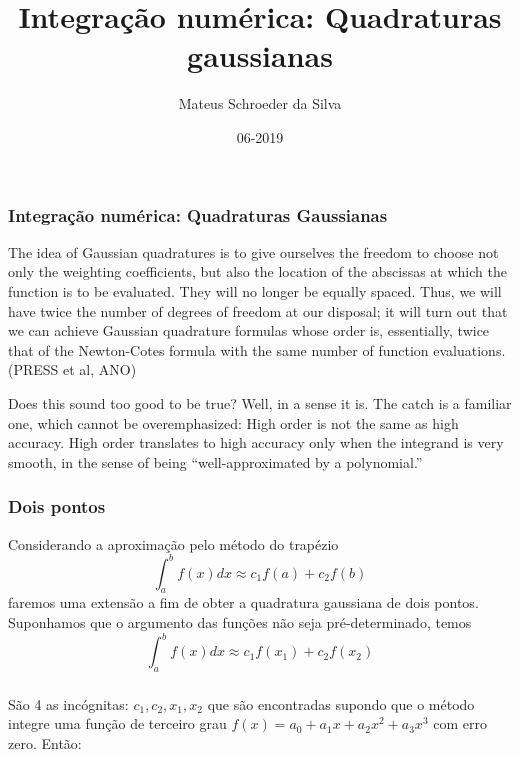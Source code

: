 \documentclass{beamer}
\title{Integração numérica: Quadraturas gaussianas}
\author[Mateus]
{Mateus Schroeder da Silva}
\institute{UDESC}
\date{06-2019}
\begin{document}
 
\frame{\titlepage}
 
\begin{frame}
\frametitle{Integração numérica: Quadraturas Gaussianas}
The idea of Gaussian quadratures is to give ourselves the freedom to
choose not only the weighting coefficients, but also the location of the abscissas at
which the function is to be evaluated. They will no longer be equally spaced. Thus,
we will have twice the number of degrees of freedom at our disposal; it will turn out
that we can achieve Gaussian quadrature formulas whose order is, essentially, twice
    that of the Newton-Cotes formula with the same number of function evaluations. (PRESS et al, ANO)
\end{frame}

\begin{frame}
Does this sound too good to be true? Well, in a sense it is. The catch is a familiar
one, which cannot be overemphasized: High order is not the same as high accuracy.
High order translates to high accuracy only when the integrand is very smooth, in the
sense of being “well-approximated by a polynomial.”
\end{frame}


\begin{frame}
\frametitle{Dois pontos}
    Considerando a aproximação pelo método do trapézio $$\int_a^b {f(x)dx} \approx c_1f(a) + c_2f(b)$$ faremos uma extensão 
    a fim de obter a quadratura gaussiana de dois pontos.
    Suponhamos que o argumento das funções não seja pré-determinado, temos $$\int_a^b {f(x)dx} \approx c_1f(x_1) + c_2f(x_2)$$
\end{frame}


\begin{frame}
\frametitle{}
    São 4 as incógnitas: $c_1, c_2, x_1, x_2$ que são encontradas supondo que o método integre uma 
    função de terceiro grau $f(x) = a_0 + a_1x + a_2x^2 + a_3x^3$ com erro zero. Então:
\end{frame}
\end{document}
